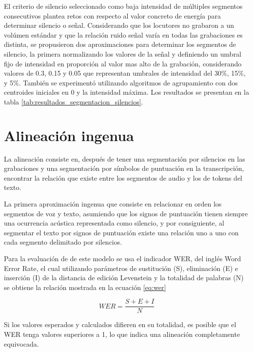 El criterio de silencio seleccionado como baja intensidad de múltiples segmentos consecutivos plantea retos con respecto al valor concreto de energía para determinar silencio o señal. Considerando que los locutores no grabaron a un volúmen estándar y que la relación ruido señal varía en todas las grabaciones es distinta, se propusieron dos aproximaciones para determinar los segmentos de silencio, la primera normalizando los valores de la señal y definiendo un umbral fijo de intensidad en proporción al valor mas alto de la grabación, considerando valores de 0.3, 0.15 y 0.05 que representan umbrales de intensidad del 30\%, 15\%, y 5\%. También se experimentó utilizando algoritmos de agrupamiento con dos centroides iniciales en 0 y la intensidad máxima. Los resultados se presentan en la tabla \ref{tab:resultados_segmentacion_silencios}.




\section{Alineación ingenua}

La alineación consiste en, después de tener una segmentación por silencios en las grabaciones y una segmentación por símbolos de puntuación en la transcripción, encontrar la relación que existe entre los segmentos de audio y los de tokens del texto.

La primera aproximación ingenua que consiste en relacionar en orden los segmentos de voz y texto, asumiendo que los signos de puntuación tienen siempre una ocurrencia acústica representada como silencio, y por consiguiente, al segmentar el texto por signos de puntuación existe una relación uno a uno con cada segmento delimitado por silencios.

Para la evaluación de de este modelo se usa el indicador WER, del inglés Word Error Rate, el cual utilizando parámetros de sustitución (S), eliminación (E) e inserción (I) de la distancia de edición Levenstein \cite{Levenshtein_SPD66} y la totalidad de palabras (N) se obtiene la relación mostrada en la ecuación \ref{eq:wer}

\begin{equation}
    \label{eq:wer}
    WER = \frac{S + E + I}{N}
\end{equation}

Si los valores esperados y calculados difieren en su totalidad, es posible que el WER tenga valores superiores a 1, lo que indica una alineación completamente equivocada.

